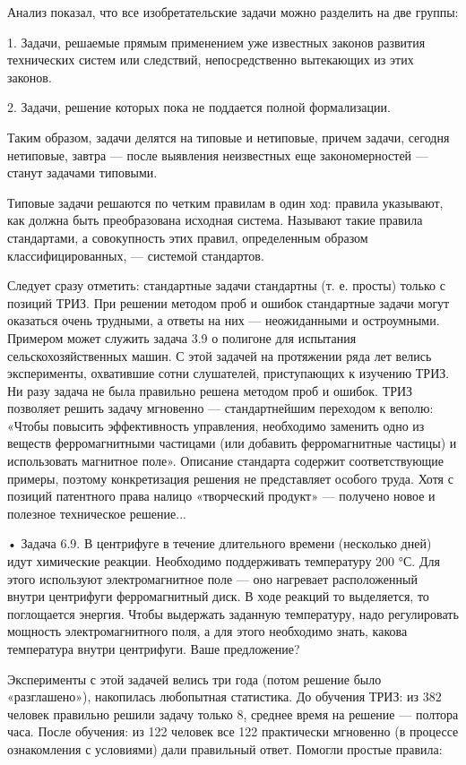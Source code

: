 Анализ показал, что все изобретательские задачи можно разделить на две
группы:


1. Задачи, решаемые прямым  применением уже известных законов развития
технических систем  или следствий, непосредственно вытекающих  из этих
законов.

2. Задачи, решение которых пока не поддается полной формализации.

Таким  образом,   задачи  делятся  на  типовые   и  нетиповые,  причем
задачи, сегодня  нетиповые, завтра  — после выявления  неизвестных еще
закономерностей — станут задачами типовыми.

Типовые  задачи  решаются  по  четким правилам  в  один  ход:  правила
указывают, как  должна быть  преобразована исходная  система. Называют
такие правила  стандартами, а  совокупность этих  правил, определенным
образом классифицированных, — системой стандартов.

Следует  сразу   отметить:  стандартные   задачи  стандартны   (т.  е.
просты)  только с  позиций ТРИЗ.  При  решении методом  проб и  ошибок
стандартные задачи могут  оказаться очень трудными, а ответы  на них —
неожиданными  и  остроумными.  Примером  может служить  задача  3.9  о
полигоне для  испытания сельскохозяйственных машин. С  этой задачей на
протяжении ряда лет велись  эксперименты, охватившие сотни слушателей,
приступающих к изучению ТРИЗ. Ни  разу задача не была правильно решена
методом  проб  и ошибок.  ТРИЗ  позволяет  решить задачу  мгновенно  —
стандартнейшим  переходом  к  веполю:  «Чтобы  повысить  эффективность
управления,  необходимо  заменить   одно  из  веществ  ферромагнитными
частицами  (или   добавить  ферромагнитные  частицы)   и  использовать
магнитное поле». Описание  стандарта содержит соответствующие примеры,
поэтому конкретизация  решения не  представляет особого труда.  Хотя с
позиций патентного права налицо  «творческий продукт» — получено новое
и полезное техническое решение...


• Задача  6.9. В центрифуге  в течение длительного  времени (несколько
дней) идут химические реакции. Необходимо поддерживать температуру 200
°С.  Для  этого  используют  электромагнитное  поле  —  оно  нагревает
расположенный внутри  центрифуги ферромагнитный  диск. В  ходе реакций
то  выделяется,  то  поглощается  энергия.  Чтобы  выдержать  заданную
температуру, надо регулировать мощность  электромагнитного поля, а для
этого  необходимо знать,  какова температура  внутри центрифуги.  Ваше
предложение?

Эксперименты  с  этой задачей  велись  три  года (потом  решение  было
«разглашено»), накопилась любопытная статистика.  До обучения ТРИЗ: из
382 человек правильно решили задачу только 8, среднее время на решение
— полтора  часа. После  обучения: из 122  человек все  122 практически
мгновенно (в процессе ознакомления с условиями) дали правильный ответ.
Помогли простые правила:

